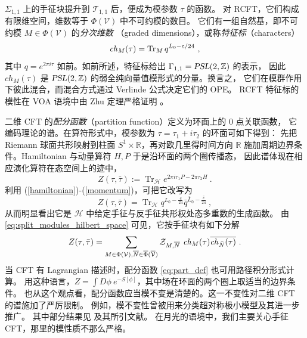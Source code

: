 \documentclass[11pt,a4paper,fontset=windows]{ctexart}
\numberwithin{equation}{section}
\newcommand{\PSL}{\operatorname{\textsl{PSL}}}    %
\newcommand{\RR}{\mathbb{R}}
\newcommand{\ZZ}{\mathbb{Z}}
\def\t{\tau}
\newcommand{\tr}{\operatorname{Tr}}
\newcommand{\eq}[1]{(\ref{#1})}
\begin{document}
$\Sigma_{1,1}$ 上的手征块提升到 $\mathcal{T}_{1,1}$ 后，便成为模参数 $\tau$ 的函数。
对 RCFT，它们构成有限维空间，维数等于 $\Phi(\mathcal{V})$ 中不可约模的数目。
它们有一组自然基，即不可约模 $M\in\Phi(\mathcal{V})$ 的\emph{分次维数}
（graded dimensions），或称\emph{特征标}（characters）
\begin{equation}
\label{eq:character}
{\it ch}_M(\tau)=\tr_{M} q^{L_0-c/24} ~, 
\end{equation}
其中 $q=e^{2\pi i\tau}$ 如前。如前所述，特征标给出 $\Gamma_{1,1}=\PSL(2,\ZZ)$ 的表示，
因此 $ch_M(\tau)$ 是 $\PSL(2,\ZZ)$ 的弱全纯向量值模形式的分量。换言之，
它们在模群作用下彼此混合，而混合方式通过 Verlinde 公式决定它们的 OPE。
RCFT 特征标的模性在 VOA 语境中由 Zhu 定理严格证明 \cite{Zhu_ModInv}。


二维 CFT 的\emph{配分函数}（partition function）定义为环面上的 0 点关联函数，
它编码理论的谱。在算符形式中，模参数为 $\tau=\tau_1+i\tau_2$ 的环面可如下得到：
先把 Riemann 球面共形映射到柱面 $S^1\times\RR$，再对欧几里得时间方向 $\RR$
施加周期边界条件。Hamiltonian 与动量算符 $H,P$ 于是沿环面的两个圈传播态，
因此谱体现在相应演化算符在态空间上的迹中，
\begin{equation}
\label{eq:part_def}
Z(\t,\bar \t) := \tr_\mathcal{H}  e^{2\pi  i \t_1 P -2\pi\t_2  H }
~.
\end{equation}
利用 \eq{hamiltonian}-\eq{momentum}，可把它改写为
\begin{equation}
Z(\tau,\bar{\tau})=\tr_{\mathcal{H}}q^{L_0-\frac{c}{24}}\bar{q}^{\bar{L}_0-\frac{\bar{c}}{24}}~,
\end{equation}
从而明显看出它是 $\mathcal{H}$ 中给定手征与反手征共形权处态多重数的生成函数。
由 \eqref{eq:split_modules_hilbert_space} 可见，它按手征块有如下分解
\begin{equation}
Z(\tau,\bar{\tau})=\sum_{M\in\Phi(\mathcal{V}),\overline{N}\in\overline{\Phi}(\overline{\mathcal{V}})}\mathcal{Z}_{M,\overline{N}}~{\it ch}_{M}(\tau)
\overline{ {\it ch}_{\bar N}(\tau)}~.
\end{equation}
当 CFT 有 Lagrangian 描述时，配分函数 \eqref{eq:part_def} 也可用路径积分形式计算。
用这种语言，$Z=\int D\phi~e^{-S[\phi]}$，其中场在环面的两个圈上取适当的边界条件。
也从这个观点看，配分函数应当模不变是清楚的。这一不变性对二维 CFT 的谱施加了严厉限制。
例如，模不变性曾被用来分类超对称极小模型及其进一步推广。
其中部分结果见 \cite{Cappelli:1987xt,MR1407165} 及其所引文献。
在月光的语境中，我们主要关心手征 CFT，那里的模性质不那么严格。
\end{document}
